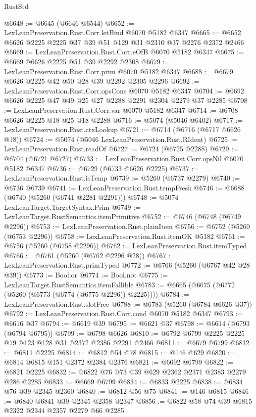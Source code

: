 \begin{lexlean}{RustStd}
\begin{coremodule}
@6648 := @6645 (@6646 @6544)
@6652 := LexLeanPreservation.Rust.Corr.letBind @6070 @5182 @6347
@6665 := @6652 @6626 @2225 @2225 @37 @39 @51 @129 @31 @2310 @37 @2276 @2372 @2466
@6669 := LexLeanPreservation.Rust.Corr.eOfB @6070 @5182 @6347
@6675 := @6669 @6626 @2225 @51 @39 @2292 @2308
@6679 := LexLeanPreservation.Rust.Corr.prim @6070 @5182 @6347
@6688 := @6679 @6626 @2225 @42 @50 @28 @39 @2292 @2305 @2296
@6692 := LexLeanPreservation.Rust.Corr.opsCons @6070 @5182 @6347
@6704 := @6692 @6626 @2225 @47 @49 @25 @27 @2288 @2291 @2304 @2279 @37 @2285
@6708 := LexLeanPreservation.Rust.Corr.var @6070 @5182 @6347
@6714 := @6708 @6626 @2225 @18 @25 @18 @2288
@6716 := @5074 (@5046 @6402)
@6717 := LexLeanPreservation.Rust.ctxLookup
@6721 := @6714 (@6716 (@6717 @6626 @18))
@6724 := @5074 (@5046 LexLeanPreservation.Rust.RIdent)
@6725 := LexLeanPreservation.Rust.readOf
@6727 := @6724 (@6725 @2288)
@6729 := @6704 (@6721 @6727)
@6733 := LexLeanPreservation.Rust.Corr.opsNil @6070 @5182 @6347
@6736 := @6729 (@6733 @6626 @2225)
@6737 := LexLeanPreservation.Rust.isTemp
@6739 := @5260 (@6737 @2279)
@6740 := @6736 @6739
@6741 := LexLeanPreservation.Rust.tempFresh
@6746 := @6688 (@6740 (@5260 (@6741 @2281 @2291)))
@6748 := @5074 LexLeanTarget.TargetSyntax.Prim
@6749 := LexLeanTarget.RustSemantics.itemPrimitive
@6752 := @6746 (@6748 (@6749 @2296))
@6753 := LexLeanPreservation.Rust.plainItem
@6756 := @6752 (@5260 (@6753 @2296))
@6758 := LexLeanPreservation.Rust.itemOK @5182
@6761 := @6756 (@5260 (@6758 @2296))
@6762 := LexLeanPreservation.Rust.itemTyped
@6766 := @6761 (@5260 (@6762 @2296 @28))
@6767 := LexLeanPreservation.Rust.primTyped
@6772 := @6766 (@5260 (@6767 @42 @28 @39))
@6773 := Bool.or
@6774 := Bool.not
@6775 := LexLeanTarget.RustSemantics.itemFallible
@6783 := @6665 (@6675 (@6772 (@5260 (@6773 (@6774 (@6775 @2296)) @2225))))
@6784 := LexLeanPreservation.Rust.slotFree
@6788 := @6783 (@5260 (@6784 @6626 @37))
@6792 := LexLeanPreservation.Rust.Corr.cond @6070 @5182 @6347
@6793 := @6616 @37
@6794 := @6619 @39
@6795 := @6621 @37
@6798 := @6614 (@6793 (@6794 @6795))
@6799 := @6798 @6626
@6810 := @6792 @6799 @2225 @2225 @79 @123 @128 @31 @2372 @2386 @2291 @2466
@6811 := @6679 @6799
@6812 := @6811 @2225
@6814 := @6812 @54 @78
@6815 := @146 @629
@6820 := @6814 @6815 @151 @2372 @2384 @2376
@6821 := @6692 @6799
@6822 := @6821 @2225
@6832 := @6822 @76 @73 @39 @629 @2362 @2371 @2383 @2279 @286 @2285
@6833 := @6669 @6799
@6834 := @6833 @2225
@6838 := @6834 @76 @39 @2345 @2360
@6840 := @6812 @56 @75
@6841 := @146 @6815
@6846 := @6840 @6841 @39 @2345 @2358 @2347
@6856 := @6822 @58 @74 @39 @6815 @2322 @2344 @2357 @2279 @66 @2285

\end{coremodule}
\end{lexlean}

